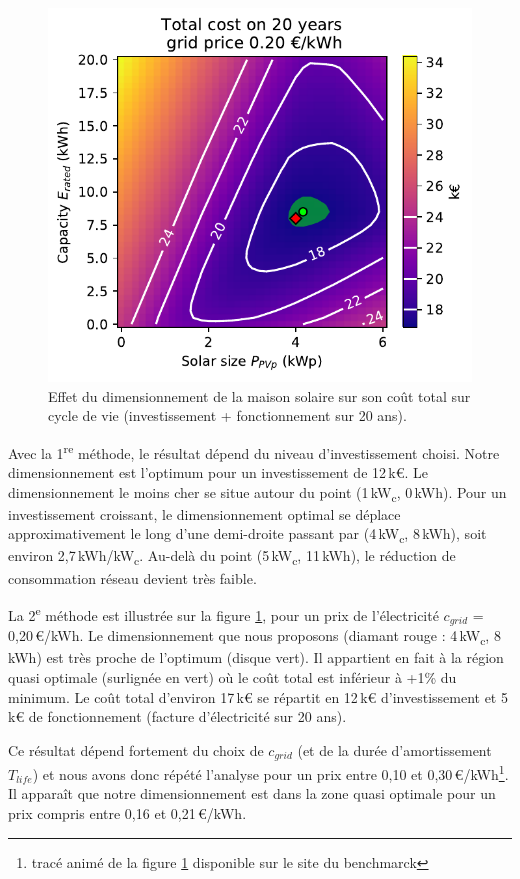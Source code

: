 \documentclass[a4paper,10pt,twocolumn]{article}
\newcommand\tsp[1]{\textsuperscript{#1}}
\newcommand\sub[1]{\textsubscript{#1}}
\newcommand\kWc{kW\sub{c}{}}
\begin{document}
\begin{figure}[!ht]
  \begin{center}
	  \includegraphics[width=0.8\columnwidth]{figures/Total_cost_map_grid020.pdf}
  \end{center}

  \caption{Effet du dimensionnement de la maison solaire sur son coût total sur cycle de vie
  (investissement + fonctionnement sur 20 ans).
  }
  \label{fig:cost_tot}
\end{figure}

Avec la 1\tsp{re} méthode, le résultat dépend du niveau d'investissement choisi.
Notre dimensionnement est l'optimum pour un investissement de 12\,k€.
Le dimensionnement le moins cher se situe autour du point
(1\,\kWc, 0\,kWh). Pour un investissement croissant,
le dimensionnement optimal se déplace approximativement le long
d'une demi-droite passant par (4\,\kWc, 8\,kWh), soit environ
2,7\,kWh/\kWc.
Au-delà du point (5\,\kWc, 11\,kWh), le réduction de consommation réseau devient très faible.

La 2\tsp{e} méthode est illustrée sur la figure \ref{fig:cost_tot},
pour un prix de l'électricité $c_{grid}$ = 0,20\,€/kWh.
Le dimensionnement que nous proposons (diamant rouge : 4\,kW\sub{c}, 8\,kWh)
est très proche de l'optimum (disque vert).
Il appartient en fait à la région quasi optimale (surlignée en vert)
où le coût total est inférieur à +1\% du minimum.
Le coût total d'environ 17\,k€ se répartit en 12\,k€ d'investissement
et 5\,k€ de fonctionnement (facture d'électricité sur 20 ans).

Ce résultat dépend fortement du choix de $c_{grid}$
(et de la durée d'amortissement $T_{life}$)
et nous avons donc répété l'analyse pour un prix entre 0,10 et 0,30\,€/kWh\footnote{%
  tracé animé de la figure \ref{fig:cost_tot} disponible sur le site du benchmarck}.
Il apparaît que notre dimensionnement est dans la zone quasi optimale pour un prix
compris entre 0,16 et 0,21\,€/kWh.
\end{document}
